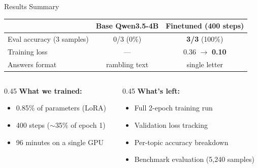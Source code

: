 \documentclass[aspectratio=169, 11pt]{beamer}
\begin{document}
\begin{frame}{Results Summary}

\centering

\begin{tabular}{@{}lcc@{}}
\toprule
& \textbf{Base Qwen3.5-4B} & \textbf{Finetuned (400 steps)} \\
\midrule
Eval accuracy (3 samples) & 0/3 \textcolor{wrong}{(0\%)} & \textbf{3/3} \textcolor{correct}{(100\%)} \\
Training loss & --- & 0.36 $\to$ \textbf{0.10} \\
Answers format & rambling text & single letter \\
\bottomrule
\end{tabular}

\vspace{1.5em}

\begin{columns}
\begin{column}{0.45\textwidth}
    \textbf{What we trained:}
    \begin{itemize}
        \item 0.85\% of parameters (LoRA)
        \item 400 steps ($\sim$35\% of epoch 1)
        \item 96 minutes on a single GPU
    \end{itemize}
\end{column}
\begin{column}{0.45\textwidth}
    \textbf{What's left:}
    \begin{itemize}
        \item Full 2-epoch training run
        \item Validation loss tracking
        \item Per-topic accuracy breakdown
        \item Benchmark evaluation (5,240 samples)
    \end{itemize}
\end{column}
\end{columns}

\end{frame}

\end{document}
